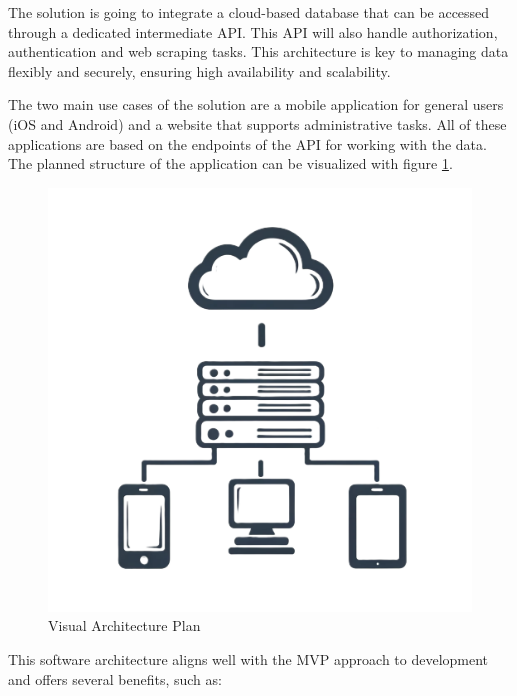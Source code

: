 The solution is going to integrate a cloud-based database that can be accessed through a dedicated intermediate API. This API will also handle authorization, authentication and web scraping tasks.
This architecture is key to managing data flexibly and securely, ensuring high availability and scalability.

\newpage

The two main use cases of the solution are a mobile application for general users (iOS and Android) and a website that supports administrative tasks. All of these applications are based on the endpoints of the API for working with the data. The planned structure of the application can be visualized with figure \ref{fig:ur5}.
\begin{figure}[H]
	\centering
	\includegraphics[width=0.5\linewidth]{img/architecturePlan.png}
	\caption{Visual Architecture Plan}
	\label{fig:ur5}
\end{figure}

This software architecture aligns well with the MVP approach to development and offers several benefits, such as:

